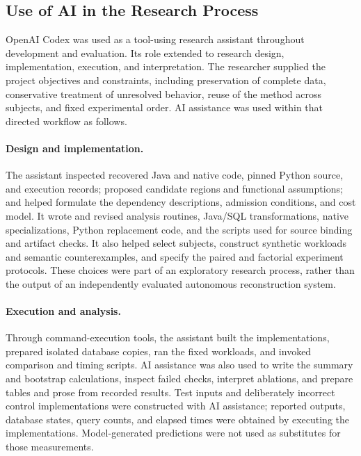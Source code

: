 \documentclass[acmsmall,screen,review,anonymous]{acmart}
\begin{document}
\subsection{Use of AI in the Research Process}
\label{sec:ai-disclosure}
OpenAI Codex was used as a tool-using research assistant throughout development
and evaluation. Its role extended to research design, implementation, execution,
and interpretation. The researcher supplied the project objectives and constraints,
including preservation of complete data, conservative treatment of unresolved
behavior, reuse of the method across subjects, and fixed experimental order.
AI assistance was used within that directed workflow as follows.

\paragraph{Design and implementation.}
The assistant inspected recovered Java and native code, pinned Python source, and execution
records; proposed candidate regions and functional assumptions; and helped
formulate the dependency descriptions, admission conditions, and cost model.
It wrote and revised analysis routines, Java/SQL transformations, native specializations, Python
replacement code, and the scripts used for source binding and artifact checks.
It also helped select subjects, construct synthetic workloads and semantic
counterexamples, and specify the paired and factorial experiment protocols.
These choices were part of an exploratory research process, rather than the
output of an independently evaluated autonomous reconstruction system.

\paragraph{Execution and analysis.}
Through command-execution tools, the assistant built the implementations,
prepared isolated database copies, ran the fixed workloads, and invoked
comparison and timing scripts. AI assistance was also used to write the
summary and bootstrap calculations, inspect failed checks, interpret ablations,
and prepare tables and prose from recorded results. Test inputs and deliberately
incorrect control implementations were constructed with AI assistance; reported
outputs, database states, query counts, and elapsed times were obtained by
executing the implementations. Model-generated predictions were not used as
substitutes for those measurements.
\end{document}
